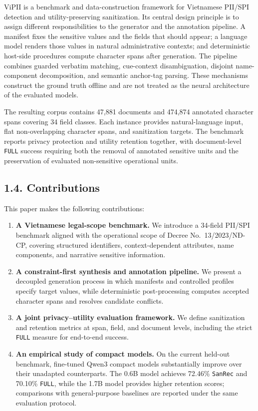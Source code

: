 \documentclass[
]{article}
\providecommand{\tightlist}{%
  \setlength{\itemsep}{0pt}\setlength{\parskip}{0pt}}
\begin{document}
ViPII is a benchmark and data-construction framework for Vietnamese
PII/SPI detection and utility-preserving sanitization. Its central
design principle is to assign different responsibilities to the
generator and the annotation pipeline. A manifest fixes the sensitive
values and the fields that should appear; a language model renders those
values in natural administrative contexts; and deterministic host-side
procedures compute character spans after generation. The pipeline
combines guarded verbatim matching, cue-context disambiguation, disjoint
name-component decomposition, and semantic anchor-tag parsing. These
mechanisms construct the ground truth offline and are not treated as the
neural architecture of the evaluated models.

The resulting corpus contains 47,881 documents and 474,874 annotated
character spans covering 34 field classes. Each instance provides
natural-language input, flat non-overlapping character spans, and
sanitization targets. The benchmark reports privacy protection and
utility retention together, with document-level \texttt{FULL} success
requiring both the removal of annotated sensitive units and the
preservation of evaluated non-sensitive operational units.

\subsection{1.4. Contributions}\label{contributions}

This paper makes the following contributions:

\begin{enumerate}
\def\labelenumi{\arabic{enumi}.}
\tightlist
\item
  \textbf{A Vietnamese legal-scope benchmark.} We introduce a 34-field
  PII/SPI benchmark aligned with the operational scope of Decree
  No.~13/2023/NĐ-CP, covering structured identifiers, context-dependent
  attributes, name components, and narrative sensitive information.
\item
  \textbf{A constraint-first synthesis and annotation pipeline.} We
  present a decoupled generation process in which manifests and
  controlled profiles specify target values, while deterministic
  post-processing computes accepted character spans and resolves
  candidate conflicts.
\item
  \textbf{A joint privacy--utility evaluation framework.} We define
  sanitization and retention metrics at span, field, and document
  levels, including the strict \texttt{FULL} measure for end-to-end
  success.
\item
  \textbf{An empirical study of compact models.} On the current held-out
  benchmark, fine-tuned Qwen3 compact models substantially improve over
  their unadapted counterparts. The 0.6B model achieves 72.46\%
  \texttt{SanRec} and 70.10\% \texttt{FULL}, while the 1.7B model
  provides higher retention scores; comparisons with general-purpose
  baselines are reported under the same evaluation protocol.
\end{enumerate}
\end{document}
